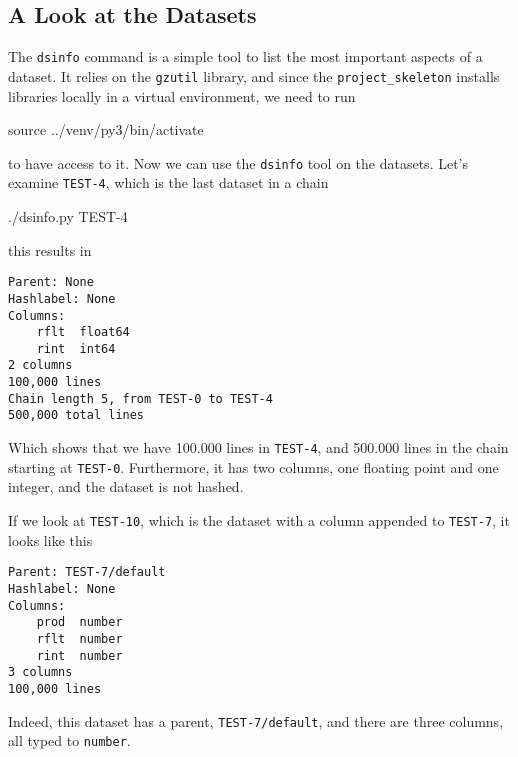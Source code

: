 \documentclass[a4paper]{article}
\begin{document}
\subsection*{A Look at the Datasets}
The \texttt{dsinfo} command is a simple tool to list the most
important aspects of a dataset.  It relies on the \texttt{gzutil}
library, and since the \texttt{project\_skeleton} installs libraries
locally in a virtual environment, we need to run
\begin{shell2}
source ../venv/py3/bin/activate
\end{shell2}
to have access to it.  Now we can use the \texttt{dsinfo} tool on the
datasets.  Let's examine \texttt{TEST-4}, which is the last dataset in
a chain
\begin{shell2}
./dsinfo.py TEST-4
\end{shell2}
this results in
\begin{snugshade}
\begin{Verbatim}[commandchars=\\\{\}]
Parent: None
Hashlabel: None
Columns:
    rflt  float64
    rint  int64
2 columns
100,000 lines
Chain length 5, from TEST-0 to TEST-4
500,000 total lines
\end{Verbatim}
\end{snugshade}
Which shows that we have 100.000 lines in \texttt{TEST-4}, and 500.000
lines in the chain starting at \texttt{TEST-0}.  Furthermore, it has
two columns, one floating point and one integer, and the dataset is
not hashed.

If we look at \texttt{TEST-10}, which is the dataset with a column
appended to \texttt{TEST-7}, it looks like this
\begin{snugshade}
\begin{Verbatim}[commandchars=\\\{\}]
Parent: TEST-7/default
Hashlabel: None
Columns:
    prod  number
    rflt  number
    rint  number
3 columns
100,000 lines
\end{Verbatim}
\end{snugshade}
Indeed, this dataset has a parent, \texttt{TEST-7/default}, and there
are three columns, all typed to \texttt{number}.
\end{document}
